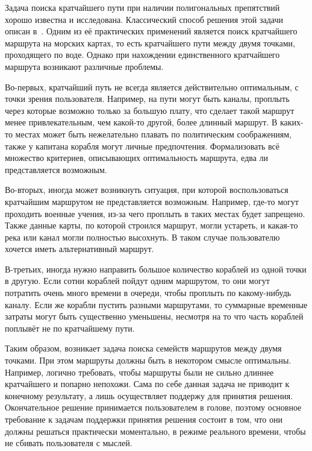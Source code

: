 \startprefacepage

Задача поиска кратчайшего пути при наличии полигональных препятствий
хорошо известна и исследована. Классический способ решения этой задачи
описан в~\cite{de2000computational}. Одним из её практических
применений является поиск кратчайшего маршрута на морских картах, то
есть кратчайшего пути между двумя точками, проходящего по воде. Однако
при нахождении единственного кратчайшего маршрута возникают различные
проблемы.

Во-первых, кратчайший путь не всегда является действительно
оптимальным, с точки зрения пользователя. Например, на пути могут быть
каналы, проплыть через которые возможно только за большую плату, что
сделает такой маршрут менее привлекательным, чем какой-то другой,
более длинный маршрут. В каких-то местах может быть нежелательно
плавать по политическим соображениям, также у капитана корабля могут
личные предпочтения. Формализовать всё множество критериев,
описывающих оптимальность маршрута, едва ли представляется возможным.

Во-вторых, иногда может возникнуть ситуация, при которой
воспользоваться кратчайшим маршрутом не представляется возможным.
Например, где-то могут проходить военные учения, из-за чего проплыть в
таких местах будет запрещено. Также данные карты, по которой строился
маршрут, могли устареть, и какая-то река или канал могли полностью
высохнуть. В таком случае пользователю хочется иметь альтернативный
маршрут.

В-третьих, иногда нужно направить большое количество кораблей из одной
точки в другую. Если сотни кораблей пойдут одним маршрутом, то они
могут потратить очень много времени в очереди, чтобы проплыть по
какому-нибудь каналу. Если же корабли пустить разными маршрутами, то
суммарные временные затраты могут быть существенно уменьшены, несмотря
на то что часть кораблей поплывёт не по кратчайшему пути.

Таким образом, возникает задача поиска семейств маршрутов между двумя
точками. При этом маршруты должны быть в некотором смысле оптимальны.
Например, логично требовать, чтобы маршруты были не сильно длиннее
кратчайшего и попарно непохожи. Сама по себе данная задача не приводит
к конечному результату, а лишь осуществляет поддержу для принятия
решения. Окончательное решение принимается пользователем в голове,
поэтому основное требование к задачам поддержки принятия решения
состоит в том, что они должны решаться практически моментально, в
режиме реального времени, чтобы не сбивать пользователя с мыслей.

